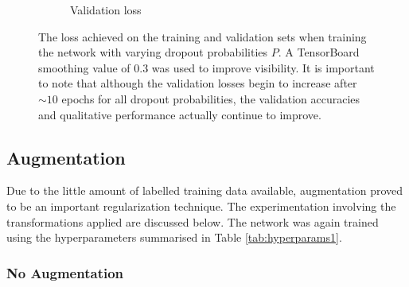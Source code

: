 \begin{figure}[t]
\begin{subfigure}[b]{0.49\textwidth}
        \caption{Validation loss}
    \end{subfigure}
    \caption{The loss achieved on the training and validation sets when training the network with varying dropout probabilities $P$. A TensorBoard smoothing value of 0.3 was used to improve visibility. It is important to note that although the validation losses begin to increase after ${\sim}10$ epochs for all dropout probabilities, the validation accuracies and qualitative performance actually continue to improve.}
    \label{fig:dropoutplots}
\end{figure}



\subsection{Augmentation}
\label{sec:evalaugmentation}

Due to the little amount of labelled training data available, augmentation proved to be an important regularization technique. The experimentation involving the transformations applied are discussed below. The network was again trained using the hyperparameters summarised in Table \ref{tab:hyperparams1}.

\subsubsection{No Augmentation}

